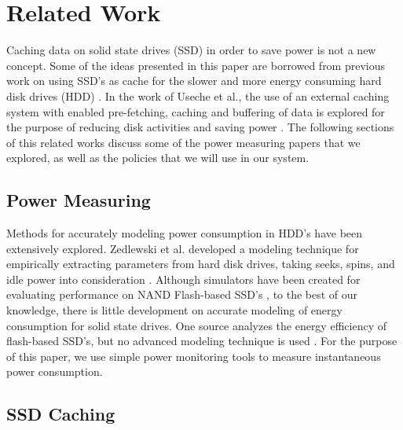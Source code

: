 \section{Related Work}
\label{sec:related}

Caching data on solid state drives (SSD) in order to save power is not a new
concept. Some of the ideas presented in this paper are borrowed from previous
work on using SSD's as cache for the slower and more energy consuming hard disk
drives (HDD) \cite{flash-disk-hybrid}. In the work of Useche et al., the use of
an external caching system with enabled pre-fetching, caching and buffering of
data is explored for the purpose of reducing disk activities and saving power
\cite{extern-cache-energy-saving}. The following sections of this related works
discuss some of the power measuring papers that we explored, as well as the
policies that we will use in our system.

\subsection{Power Measuring}

Methods for accurately modeling power consumption in HDD's have been extensively
explored. Zedlewski et al. developed a modeling technique for empirically
extracting parameters from hard disk drives, taking seeks, spins, and idle power
into consideration \cite{hard-disk-power}. Although simulators have been created
for evaluating performance on NAND Flash-based SSD's \cite{flashsim}, to the best
of our knowledge, there is little development on accurate modeling of energy
consumption for solid state drives. One source analyzes the energy efficiency of
flash-based SSD's, but no advanced modeling technique is used
\cite{ssd-energy-efficiency}. For the purpose of this paper, we use simple power
monitoring tools to measure instantaneous power consumption.

\subsection{SSD Caching}




